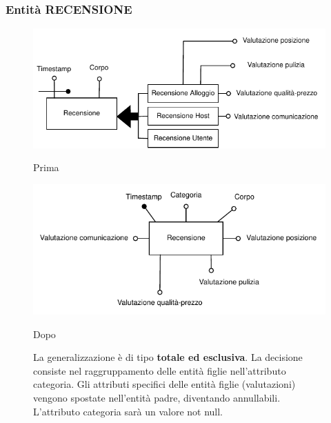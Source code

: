 \subsubsection{Entità RECENSIONE}
\begin{figure}[H]
      \centering
      \begin{minipage}[b]{0.45\textwidth}
            \includegraphics[width=\textwidth]{resources/pdf/page7.pdf}
            \caption{Prima}
      \end{minipage}
      \hfill
      \begin{minipage}[b]{0.45\textwidth}
            \includegraphics[width=\textwidth]{resources/pdf/page8.pdf}
            \caption{Dopo}
      \end{minipage}
      \caption*{La generalizzazione è di tipo \textbf{totale ed esclusiva}. La decisione consiste nel raggruppamento delle entità	figlie nell'attributo categoria. Gli attributi specifici delle entità figlie (valutazioni) vengono spostate nell'entità padre, diventando annullabili. L'attributo categoria sarà un valore not null.}
\end{figure}

